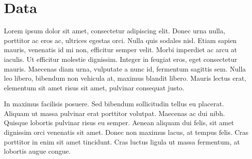 \section{ Data }


Lorem ipsum dolor sit amet, consectetur adipiscing elit. Donec urna nulla, porttitor ac eros ac, ultrices egestas orci. 
Nulla quis sodales nisl. Etiam sapien mauris, venenatis id mi non, efficitur semper velit. Morbi imperdiet ac arcu at iaculis. 
Ut efficitur molestie dignissim. Integer in feugiat eros, eget consectetur mauris. Maecenas diam urna, vulputate a nunc id, fermentum sagittis sem. 
Nulla leo libero, bibendum non vehicula at, maximus blandit libero. Mauris lectus erat, elementum sit amet risus sit amet, pulvinar consequat justo. 


In maximus facilisis posuere. Sed bibendum sollicitudin tellus eu placerat. 
Aliquam ut massa pulvinar erat porttitor volutpat. Maecenas ac dui nibh. Quisque lobortis pulvinar risus eu semper. 
Aenean aliquam dui felis, sit amet dignissim orci venenatis sit amet. 
Donec non maximus lacus, at tempus felis. Cras porttitor in enim sit amet tincidunt. 
Cras luctus ligula ut massa fermentum, at lobortis augue congue. 

\pagebreak
